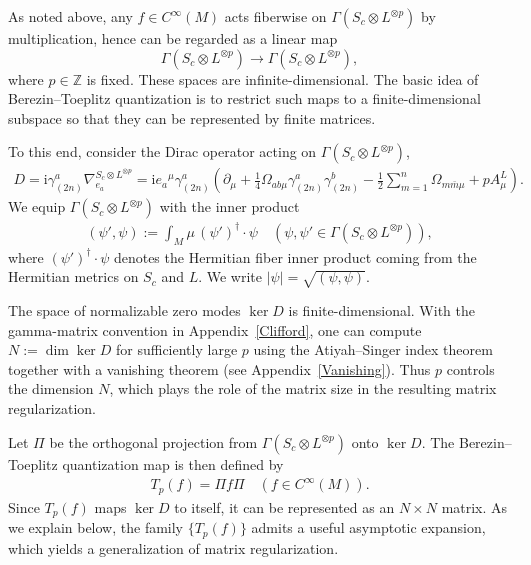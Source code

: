 \documentclass[12pt]{article}
\newcommand{\im}{\mathrm{i}}
\theoremstyle{definition} %
\theoremstyle{plain} %
\theoremstyle{remark} %
\theoremstyle{underline}
\begin{document}
As noted above, any \(f\in C^\infty(M)\) acts fiberwise on
\(\Gamma(S_c\otimes L^{\otimes p})\) by multiplication, hence can be regarded as a linear map
\[
    \Gamma(S_c\otimes L^{\otimes p}) \longrightarrow \Gamma(S_c\otimes L^{\otimes p}),
\]
where \(p\in\mathbb{Z}\) is fixed.
These spaces are infinite-dimensional.
The basic idea of Berezin--Toeplitz quantization is to restrict such maps to a finite-dimensional subspace so that they can be represented by finite matrices.

To this end, consider the Dirac operator acting on
\(\Gamma(S_c\otimes L^{\otimes p})\),
\begin{align}
    \label{twisted Dirac}
    D = \im \gamma_{(2n)}^{a} \nabla^{S_c\otimes L^{\otimes p} }_{e_a}
    = \im e_a{}^{\mu}\gamma_{(2n)}^{a} \left(
    \partial_{\mu} + \frac{1}{4} \Omega_{ab\mu} \gamma_{(2n)}^a \gamma_{(2n)}^b
    - \frac{1}{2} \sum_{m=1}^n \Omega_{m \bar{m} \mu}
    + p A^L_{\mu} \right).
\end{align}
We equip \(\Gamma(S_c\otimes L^{\otimes p})\) with the inner product
\begin{align}
    \label{inner product}
    (\psi',\psi) := \int_M \mu \, (\psi')^{\dagger} \cdot \psi
    \quad (\psi,\psi' \in \Gamma(S_c \otimes L^{\otimes p})),
\end{align}
where \((\psi')^\dagger\cdot\psi\) denotes the Hermitian fiber inner product coming from the Hermitian metrics on \(S_c\) and \(L\).
We write \(|\psi|=\sqrt{(\psi,\psi)}\).

The space of normalizable zero modes \(\ker D\) is finite-dimensional.
With the gamma-matrix convention in Appendix~\ref{Clifford}, one can compute \(N:=\dim\ker D\) for sufficiently large \(p\) using the Atiyah--Singer index theorem together with a vanishing theorem (see Appendix~\ref{Vanishing}).
Thus \(p\) controls the dimension \(N\), which plays the role of the matrix size in the resulting matrix regularization.

Let \(\Pi\) be the orthogonal projection from \(\Gamma(S_c\otimes L^{\otimes p})\) onto \(\ker D\).
The Berezin--Toeplitz quantization map is then defined by
\begin{align}
    T_p(f) = \Pi f \Pi \quad (f \in C^\infty(M)).
    \label{Toeplitz op}
\end{align}
Since \(T_p(f)\) maps \(\ker D\) to itself, it can be represented as an \(N\times N\) matrix.
As we explain below, the family \(\{T_p(f)\}\) admits a useful asymptotic expansion, which yields a generalization of matrix regularization.
\end{document}
